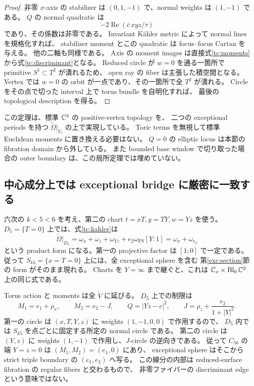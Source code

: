 \begin{proof}
非零 $x$-axis の stabilizer は $(0,1,-1)$ で、normal weights は $(1,-1)$ である。
$Q$ の normal quadratic は
\[
 -2\operatorname{Re}(\bar c\,x yz/\tau)
\]
であり、その係数は非零である。
Invariant Kähler metric によって normal lines を規格化すれば、
stabilizer moment とこの quadratic は focus--focus Cartan を与える。
他の二軸も同様である。
Axis の moment images は直接式\eqref{tc:moments}から式\eqref{tc:discriminant}となる。
Reduced circle が $w=0$ を通る一箇所で primitive $S^1\subset T^2$ が潰れるため、
open ray の fiber は主張した積空間となる。
Vertex では $w=0$ の orbit が一点であり、その一箇所で全 $T^2$ が潰れる。
Circle をその点で切った interval 上で torus bundle を自明化すれば、
最後の topological description を得る。
\end{proof}

この定理は、標準 $\mathbb C^3$ の positive-vertex topology を、
二つの exceptional periods を持つ $\widetilde\Omega|_{\widetilde V_\tau}$ の上で実現している。
Toric terms を無視して標準 Euclidean moments に置き換える必要はない。
$Q=0$ の elliptic locus は本節の fibration domain から外している。
また bounded base window で切り取った場合の outer boundary は、この局所定理では埋めていない。

\subsection{中心成分上では exceptional bridge に厳密に一致する}
\label{tc:surface}

六次の $k<5<6$ を考え、第二の chart $t=xT,y=TY,w=Yz$ を使う。
$D_5=\{T=0\}$ 上では、式\eqref{tc:kahler}は
\begin{equation}\label{tc:central-form}
 \widetilde\Omega|_{D_5}
 =\omega_x+\omega_z+\omega_{Yz}+e_2\omega_{\mathrm{FS}}[Y:1]
 =\omega_x+\omega_{e_2}
\end{equation}
という product form になる。第一の projective factor は $[1:0]$ で一定である。
従って $S_{k5}=\{x=T=0\}$ 上には、全 exceptional sphere を含む
第\ref{exc:section}節の form がそのまま現れる。
Charts を $Y=\infty$ まで継ぐと、これは $\mathbb C_x\times\operatorname{Bl}_0\mathbb C^2$ 上の同じ式である。

Torus action と moments は全 $\widetilde V$ に延びる。
$D_5$ 上での制限は
\begin{equation}\label{tc:central-moments}
 M_1=e_1+\rho_x,\qquad
 M_2=e_2-J,\qquad
 Q=|Yz-c|^2,
 \qquad J=\rho_z+\frac{e_2}{1+|Y|^2}.
\end{equation}
第一の circle は $(x,T,Y,z)$ に weights $(1,-1,0,0)$ で作用するので、
$D_5$ 内では $S_{k5}$ を点ごとに固定する所定の normal circle である。
第二の circle は $(Y,z)$ に weights $(1,-1)$ で作用し、$J$-circle の逆向きである。
従って $C_{56}$ の端 $Y=z=0$ は $(M_1,M_2)=(e_1,0)$ にあり、
exceptional sphere はそこから strict triple boundary の $(e_1,e_2)$ へ写る。
この線分の内部は reduced-surface fibration の regular fibers と交わるもので、
非零ファイバーの discriminant edge という意味ではない。

